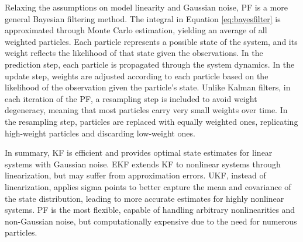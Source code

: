 Relaxing the assumptions on model linearity and Gaussian noise, \ac{PF} \citep{pf1993, Elfring2021-xf} is a more general Bayesian filtering method. The integral in Equation \ref{eq:bayesfilter} is approximated through Monte Carlo estimation, yielding an average of all weighted particles. Each particle represents a possible state of the system, and its weight reflects the likelihood of that state given the observations. In the prediction step, each particle is propagated through the system dynamics. In the update step, weights are adjusted according to each particle based on the likelihood of the observation given the particle's state. Unlike Kalman filters, in each iteration of the \ac{PF}, a resampling step is included to avoid weight degeneracy, meaning that most particles carry very small weights over time. In the resampling step, particles are replaced with equally weighted ones, replicating high-weight particles and discarding low-weight ones.

In summary, \ac{KF} is efficient and provides optimal state estimates for linear systems with Gaussian noise. \ac{EKF} extends \ac{KF} to nonlinear systems through linearization, but may suffer from approximation errors. \ac{UKF}, instead of linearization, applies sigma points to better capture the mean and covariance of the state distribution, leading to more accurate estimates for highly nonlinear systems. \ac{PF} is the most flexible, capable of handling arbitrary nonlinearities and non-Gaussian noise, but computationally expensive due to the need for numerous particles.


